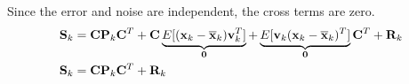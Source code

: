 Since the error and noise are independent, the cross terms are zero.
\begin{align*}
  \mathbf{S}_k &= \mathbf{C}\mathbf{P}_k\mathbf{C}^T +
    \mathbf{C}\underbrace{E[(\mathbf{x}_k - \overline{\mathbf{x}}_k)\mathbf{v}_k^T]}_{\mathbf{0}} +
    \underbrace{
      E[\mathbf{v}_k(\mathbf{x}_k - \overline{\mathbf{x}}_k)^T]}_{\mathbf{0}}\mathbf{C}^T + \mathbf{R}_k \\
  \mathbf{S}_k &= \mathbf{C}\mathbf{P}_k\mathbf{C}^T + \mathbf{R}_k
\end{align*}

